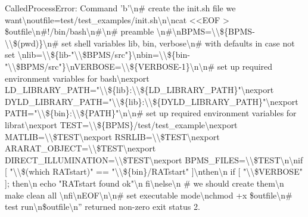 \documentclass[letterpaper,10pt,english]{sphinxmanual}
\begin{document}
{\begin{sphinxVerbatim}[commandchars=\\\{\}]
\textcolor{ansi-red}{CalledProcessError}: Command 'b'\textbackslash{}n\# create the init.sh file we want\textbackslash{}noutfile=test/test\_examples/init.sh\textbackslash{}n\textbackslash{}ncat <<EOF > \$outfile\textbackslash{}n\#!/bin/bash\textbackslash{}n\#\textbackslash{}n\# preamble \textbackslash{}n\#\textbackslash{}nBPMS=\textbackslash{}\textbackslash{}\$\{BPMS-\textbackslash{}\textbackslash{}\$(pwd)\}\textbackslash{}n\# set shell variables lib, bin, verbose\textbackslash{}n\# with defaults in case not set \textbackslash{}nlib=\textbackslash{}\textbackslash{}\$\{lib-"\textbackslash{}\textbackslash{}\$BPMS/src"\}\textbackslash{}nbin=\textbackslash{}\textbackslash{}\$\{bin-"\textbackslash{}\textbackslash{}\$BPMS/src"\}\textbackslash{}nVERBOSE=\textbackslash{}\textbackslash{}\$\{VERBOSE-1\}\textbackslash{}n\textbackslash{}n\# set up required environment variables for bash\textbackslash{}nexport LD\_LIBRARY\_PATH="\textbackslash{}\textbackslash{}\$\{lib\}:\textbackslash{}\textbackslash{}\$\{LD\_LIBRARY\_PATH\}"\textbackslash{}nexport DYLD\_LIBRARY\_PATH="\textbackslash{}\textbackslash{}\$\{lib\}:\textbackslash{}\textbackslash{}\$\{DYLD\_LIBRARY\_PATH\}"\textbackslash{}nexport PATH="\textbackslash{}\textbackslash{}\$\{bin\}:\textbackslash{}\textbackslash{}\$\{PATH\}"\textbackslash{}n\textbackslash{}n\# set up required environment variables for librat\textbackslash{}nexport TEST=\textbackslash{}\textbackslash{}\$\{BPMS\}/test/test\_example\textbackslash{}nexport MATLIB=\textbackslash{}\textbackslash{}\$TEST\textbackslash{}nexport RSRLIB=\textbackslash{}\textbackslash{}\$TEST\textbackslash{}nexport ARARAT\_OBJECT=\textbackslash{}\textbackslash{}\$TEST\textbackslash{}nexport DIRECT\_ILLUMINATION=\textbackslash{}\textbackslash{}\$TEST\textbackslash{}nexport BPMS\_FILES=\textbackslash{}\textbackslash{}\$TEST\textbackslash{}n\textbackslash{}nif [ "\textbackslash{}\textbackslash{}\$(which RATstart)" == "\textbackslash{}\textbackslash{}\$\{bin\}/RATstart" ]\textbackslash{}nthen\textbackslash{}n  if [ "\textbackslash{}\textbackslash{}\$VERBOSE" ]; then\textbackslash{}n      echo "RATstart found ok"\textbackslash{}n  fi\textbackslash{}nelse\textbackslash{}n  \# we should create them\textbackslash{}n  make clean all \textbackslash{}nfi\textbackslash{}nEOF\textbackslash{}n\textbackslash{}n\# set executable mode\textbackslash{}nchmod +x \$outfile\textbackslash{}n\# test run\textbackslash{}n\$outfile\textbackslash{}n'' returned non-zero exit status 2.
\end{sphinxVerbatim}
}

{
\begin{sphinxVerbatim}[commandchars=\\\{\}]
\llap{\color{nbsphinxin}[ ]:\,\hspace{\fboxrule}\hspace{\fboxsep}}
\end{sphinxVerbatim}
}
\end{document}
